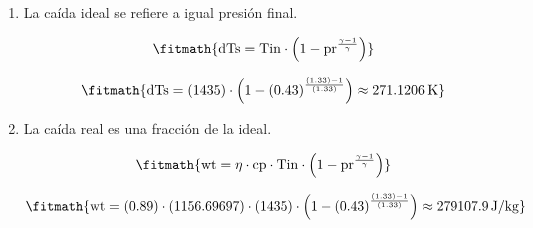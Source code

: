 \begin{enumerate}

\item La caída ideal se refiere a igual presión final.

\[\fitmath{\mathrm{dTs}=\mathrm{Tin}\cdot \left(1-{\mathrm{pr}}^{\frac{\gamma-1}{\gamma}}\right)}\]

\[\fitmath{\mathrm{dTs}=(1435)\cdot \left(1-{(0.43)}^{\frac{(1.33)-1}{(1.33)}}\right)\approx 271.1206\,\mathrm{K}}\]

\item La caída real es una fracción de la ideal.

\[\fitmath{\mathrm{wt}=\eta\cdot \mathrm{cp}\cdot \mathrm{Tin}\cdot \left(1-{\mathrm{pr}}^{\frac{\gamma-1}{\gamma}}\right)}\]

\[\fitmath{\mathrm{wt}=(0.89)\cdot (1156.69697)\cdot (1435)\cdot \left(1-{(0.43)}^{\frac{(1.33)-1}{(1.33)}}\right)\approx 279107.9\,\mathrm{J/kg}}\]

\end{enumerate}
